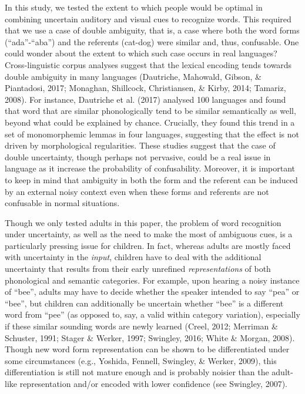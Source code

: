 \documentclass[english,man]{apa6}
\theoremstyle{definition}
\theoremstyle{definition}
\theoremstyle{definition}
\theoremstyle{remark}
\begin{document}
In this study, we tested the extent to which people would be optimal in
combining uncertain auditory and visual cues to recognize words. This
required that we use a case of double ambiguity, that is, a case where
both the word forms (\enquote{ada}-\enquote{aba}) and the referents
(cat-dog) were similar and, thus, confusable. One could wonder about the
extent to which such case occurs in real languages? Cross-linguistic
corpus analyses suggest that the lexical encoding tends towards double
ambiguity in many languages (Dautriche, Mahowald, Gibson, \& Piantadosi,
2017; Monaghan, Shillcock, Christiansen, \& Kirby, 2014; Tamariz, 2008).
For instance, Dautriche et al. (2017) analysed 100 languages and found
that word that are similar phonologically tend to be similar
semantically as well, beyond what could be explained by chance.
Crucially, they found this trend in a set of monomorphemic lemmas in
four languages, suggesting that the effect is not driven by
morphological regularities. These studies suggest that the case of
double uncertainty, though perhaps not pervasive, could be a real issue
in language as it increase the probability of confusability. Moreover,
it is important to keep in mind that ambiguity in both the form and the
referent can be induced by an external noisy context even when these
forms and referents are not confusable in normal situations.

Though we only tested adults in this paper, the problem of word
recognition under uncertainty, as well as the need to make the most of
ambiguous cues, is a particularly pressing issue for children. In fact,
whereas adults are mostly faced with uncertainty in the \emph{input},
children have to deal with the additional uncertainty that results from
their early unrefined \emph{representations} of both phonological and
semantic categories. For example, upon hearing a noisy instance of
\enquote{bee}, adults may have to decide whether the speaker intended to
say \enquote{pea} or \enquote{bee}, but children can additionally be
uncertain whether \enquote{bee} is a different word from \enquote{pee}
(as opposed to, say, a valid within category variation), especially if
these similar sounding words are newly learned (Creel, 2012; Merriman \&
Schuster, 1991; Stager \& Werker, 1997; Swingley, 2016; White \& Morgan,
2008). Though new word form representation can be shown to be
differentiated under some circumstances (e.g., Yoshida, Fennell,
Swingley, \& Werker, 2009), this differentiation is still not mature
enough and is probably noisier than the adult-like representation and/or
encoded with lower confidence (see Swingley, 2007).
\end{document}
